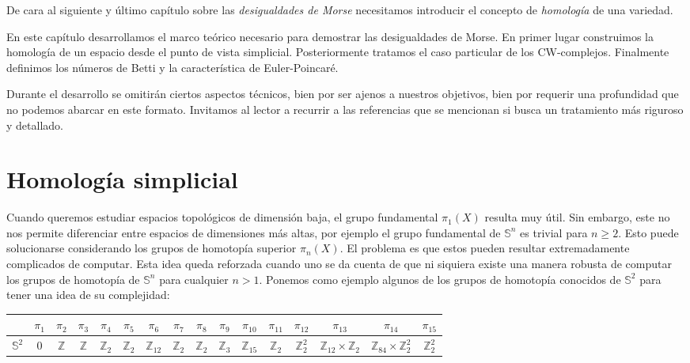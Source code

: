
De cara al siguiente y último capítulo sobre las \textit{desigualdades de Morse} necesitamos introducir el concepto de \textit{homología} de una variedad.

En este capítulo desarrollamos el marco teórico necesario para demostrar las desigualdades de Morse. En primer lugar construimos la homología de un espacio desde el punto de vista simplicial. Posteriormente tratamos el caso particular de los CW-complejos. Finalmente definimos los números de Betti y la característica de Euler-Poincaré.

Durante el desarrollo se omitirán ciertos aspectos técnicos, bien por ser ajenos a nuestros objetivos, bien por requerir una profundidad que no podemos abarcar en este formato. Invitamos al lector a recurrir a las referencias que se mencionan si busca un tratamiento más riguroso y detallado.

\section{Homología simplicial}

Cuando queremos estudiar espacios topológicos de dimensión baja, el grupo fundamental $\pi_1(X)$ resulta muy útil. Sin embargo, este no nos permite diferenciar entre espacios de dimensiones más altas, por ejemplo el grupo fundamental de $\mathbb{S}^n$ es trivial para $n\ge 2$. Esto puede solucionarse considerando los grupos de homotopía superior $\pi_n(X)$. El problema es que estos pueden resultar extremadamente complicados de computar. Esta idea queda reforzada cuando uno se da cuenta de que ni siquiera existe una manera robusta de computar los grupos de homotopía de $\mathbb{S}^n$ para cualquier $n>1$. Ponemos como ejemplo algunos de los grupos de homotopía conocidos de $\mathbb{S}^2$ para tener una idea de su complejidad:
\begin{center}
    \begin{tabular}{c|ccccccccccccccc}
    & $\pi_1$ & $\pi_2$ & $\pi_3$ & $\pi_4$ & $\pi_5$ & $\pi_6$ & $\pi_7$ & $\pi_8$ & $\pi_9$ & $\pi_{10}$ & $\pi_{11}$ & $\pi_{12}$ & $\pi_{13}$ & $\pi_{14}$ & $\pi_{15}$ \\
    \hline
    $\mathbb{S}^2$ & $0$ & $\mathbb{Z}$ & $\mathbb{Z}$ & $\mathbb{Z}_2$ & $\mathbb{Z}_2$ & $\mathbb{Z}_{12}$ & $\mathbb{Z}_2$ & $\mathbb{Z}_2$ & $\mathbb{Z}_3$ & $\mathbb{Z}_{15}$ & $\mathbb{Z}_2$ & $\mathbb{Z}_2^2$ & $\mathbb{Z}_{12}\times \mathbb{Z}_2$ & $\mathbb{Z}_{84}\times \mathbb{Z}_2^2$ & $\mathbb{Z}_2^2$
    \end{tabular}
\end{center}
\vspace{1em}

